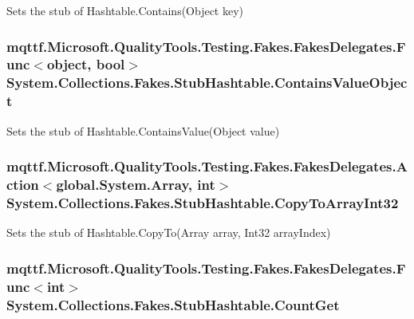 Sets the stub of Hashtable.\-Contains(\-Object key)

\hypertarget{class_system_1_1_collections_1_1_fakes_1_1_stub_hashtable_a9fb29a369faf4bad9f3dda90a4a4c4be}{
\subsubsection[{Contains\-Value\-Object}]{\setlength{\rightskip}{0pt plus 5cm}mqttf.\-Microsoft.\-Quality\-Tools.\-Testing.\-Fakes.\-Fakes\-Delegates.\-Func$<$object, bool$>$ System.\-Collections.\-Fakes.\-Stub\-Hashtable.\-Contains\-Value\-Object}}\label{class_system_1_1_collections_1_1_fakes_1_1_stub_hashtable_a9fb29a369faf4bad9f3dda90a4a4c4be}


Sets the stub of Hashtable.\-Contains\-Value(\-Object value)

\hypertarget{class_system_1_1_collections_1_1_fakes_1_1_stub_hashtable_a007d6c4df01954fefc218484e76ea72d}{
\subsubsection[{Copy\-To\-Array\-Int32}]{\setlength{\rightskip}{0pt plus 5cm}mqttf.\-Microsoft.\-Quality\-Tools.\-Testing.\-Fakes.\-Fakes\-Delegates.\-Action$<$global.\-System.\-Array, int$>$ System.\-Collections.\-Fakes.\-Stub\-Hashtable.\-Copy\-To\-Array\-Int32}}\label{class_system_1_1_collections_1_1_fakes_1_1_stub_hashtable_a007d6c4df01954fefc218484e76ea72d}


Sets the stub of Hashtable.\-Copy\-To(\-Array array, Int32 array\-Index)

\hypertarget{class_system_1_1_collections_1_1_fakes_1_1_stub_hashtable_ada50443bc702e95194614c9ea54e5d57}{
\subsubsection[{Count\-Get}]{\setlength{\rightskip}{0pt plus 5cm}mqttf.\-Microsoft.\-Quality\-Tools.\-Testing.\-Fakes.\-Fakes\-Delegates.\-Func$<$int$>$ System.\-Collections.\-Fakes.\-Stub\-Hashtable.\-Count\-Get}}\label{class_system_1_1_collections_1_1_fakes_1_1_stub_hashtable_ada50443bc702e95194614c9ea54e5d57}


